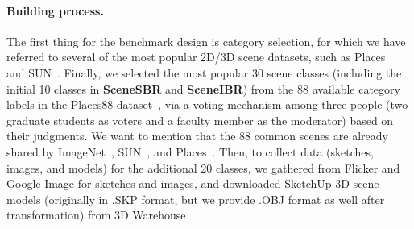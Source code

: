 \documentclass[times, 10pt,twocolumn]{article}
\begin{document}



\paragraph{Building process.} The first thing for the benchmark design is category selection, for which we have referred to several of the most popular 2D/3D scene datasets, such as Places~\cite{DBLP:journals/pami/ZhouLKO018} and SUN~\cite{DBLP:conf/cvpr/XiaoHEOT10}. Finally, we selected the most popular 30 scene classes (including the initial 10 classes in \textbf{SceneSBR} and \textbf{SceneIBR}) from the 88 available category labels in the Places88 dataset~\cite{DBLP:journals/pami/ZhouLKO018}, via a voting mechanism among three people (two graduate students as voters and a faculty member as the moderator) based on their judgments. We want to mention that the 88 common scenes are already shared by ImageNet~\cite{DBLP:conf/cvpr/DengDSLL009}, SUN~\cite{DBLP:conf/cvpr/XiaoHEOT10}, and Places~\cite{DBLP:journals/pami/ZhouLKO018}. Then, to collect data (sketches, images, and models) for the additional 20 classes, we gathered from Flicker and Google Image for sketches and images, and downloaded SketchUp 3D scene models (originally in .SKP format, but we provide .OBJ format as well after transformation) from 3D Warehouse~\cite{3DWareHouse}.
\end{document}
